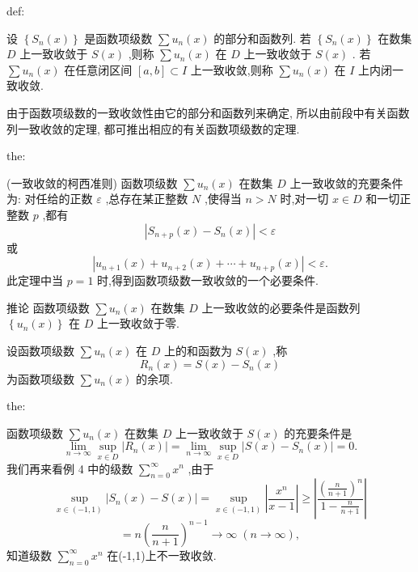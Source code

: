\begin{definition}{}{def:}

\end{definition}
设 \(\left\{  {{S}_{n}\left( x\right) }\right\}\) 是函数项级数 \(\sum {u}_{n}\left( x\right)\) 的部分和函数列. 若 \(\left\{  {{S}_{n}\left( x\right) }\right\}\) 在数集 \(D\) 上一致收敛于 \(S\left( x\right)\) ,则称 \(\sum {u}_{n}\left( x\right)\) 在 \(D\) 上一致收敛于 \(S\left( x\right)\) . 若 \(\sum {u}_{n}\left( x\right)\) 在任意闭区间 \(\left\lbrack  {a,b}\right\rbrack   \subset  I\) 上一致收敛,则称 \(\sum {u}_{n}\left( x\right)\) 在 \(I\) 上内闭一致收敛.

由于函数项级数的一致收敛性由它的部分和函数列来确定, 所以由前段中有关函数列一致收敛的定理, 都可推出相应的有关函数项级数的定理.

\begin{theorem}{}{the:}

\end{theorem}
 (一致收敛的柯西准则) 函数项级数 \(\sum {u}_{n}\left( x\right)\) 在数集 \(D\) 上一致收敛的充要条件为: 对任给的正数 \(\varepsilon\) ,总存在某正整数 \(N\) ,使得当 \(n > N\) 时,对一切 \(x \in  D\) 和一切正整数 \(p\) ,都有
\[
\left| {{S}_{n + p}\left( x\right)  - {S}_{n}\left( x\right) }\right|  < \varepsilon
\]
或
\[
\left| {{u}_{n + 1}\left( x\right)  + {u}_{n + 2}\left( x\right)  + \cdots  + {u}_{n + p}\left( x\right) }\right|  < \varepsilon .
\]
此定理中当 \(p = 1\) 时,得到函数项级数一致收敛的一个必要条件.

推论 函数项级数 \(\sum {u}_{n}\left( x\right)\) 在数集 \(D\) 上一致收敛的必要条件是函数列 \(\left\{  {{u}_{n}\left( x\right) }\right\}\) 在 \(D\) 上一致收敛于零.

设函数项级数 \(\sum {u}_{n}\left( x\right)\) 在 \(D\) 上的和函数为 \(S\left( x\right)\) ,称
\[
{R}_{n}\left( x\right)  = S\left( x\right)  - {S}_{n}\left( x\right)
\]
为函数项级数 \(\sum {u}_{n}\left( x\right)\) 的余项.

\begin{theorem}{}{the:}

\end{theorem}
 函数项级数 \(\sum {u}_{n}\left( x\right)\) 在数集 \(D\) 上一致收敛于 \(S\left( x\right)\) 的充要条件是
\[
\mathop{\lim }\limits_{{n \rightarrow  \infty }}\mathop{\sup }\limits_{{x \in  D}}\left| {{R}_{n}\left( x\right) }\right|  = \mathop{\lim }\limits_{{n \rightarrow  \infty }}\mathop{\sup }\limits_{{x \in  D}}\left| {S\left( x\right)  - {S}_{n}\left( x\right) }\right|  = 0.
\]
我们再来看例 4 中的级数 \(\mathop{\sum }\limits_{{n = 0}}^{\infty }{x}^{n}\) ,由于
\[
\mathop{\sup }\limits_{{x \in  \left( {-1,1}\right) }}\left| {{S}_{n}\left( x\right)  - S\left( x\right) }\right|  = \mathop{\sup }\limits_{{x \in  \left( {-1,1}\right) }}\left| \frac{{x}^{n}}{x - 1}\right|  \geq  \left| \frac{{\left( \frac{n}{n + 1}\right) }^{n}}{1 - \frac{n}{n + 1}}\right|
\]
\[
= n{\left( \frac{n}{n + 1}\right) }^{n - 1} \rightarrow  \infty \;\left( {n \rightarrow  \infty }\right) ,
\]
知道级数 \(\mathop{\sum }\limits_{{n = 0}}^{\infty }{x}^{n}\) 在(-1,1)上不一致收敛.

